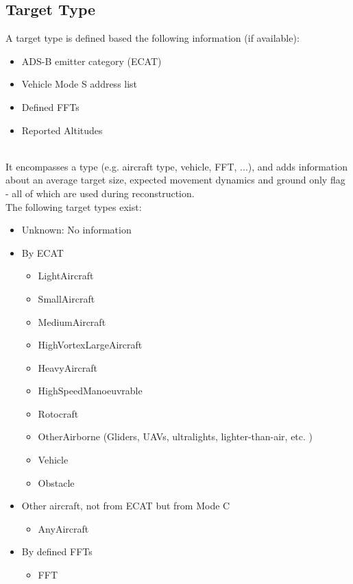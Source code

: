 \begin{itemize}
\subsection{Target Type}

A target type is defined based the following information (if available):

\begin{itemize}
\item ADS-B emitter category (ECAT)
\item Vehicle Mode S address list
\item Defined FFTs
\item Reported Altitudes
\end{itemize}

\ \\

It encompasses a type (e.g. aircraft type, vehicle, FFT, ...), and adds information about an average target size, expected movement dynamics and ground only flag - all of which are used during reconstruction. \\

The following target types exist:

\begin{itemize}
\item Unknown: No information
\item By ECAT
\begin{itemize}
\item LightAircraft
\item SmallAircraft
\item MediumAircraft
\item HighVortexLargeAircraft
\item HeavyAircraft
\item HighSpeedManoeuvrable
\item Rotocraft
\item OtherAirborne (Gliders, UAVs, ultralights, lighter-than-air, etc. )
\item Vehicle
\item Obstacle
\end{itemize}
\item Other aircraft, not from ECAT but from Mode C
\begin{itemize}
\item AnyAircraft
\end{itemize}
\item By defined FFTs
\begin{itemize}
\item FFT
\end{itemize}
\end{itemize}


\end{itemize}
